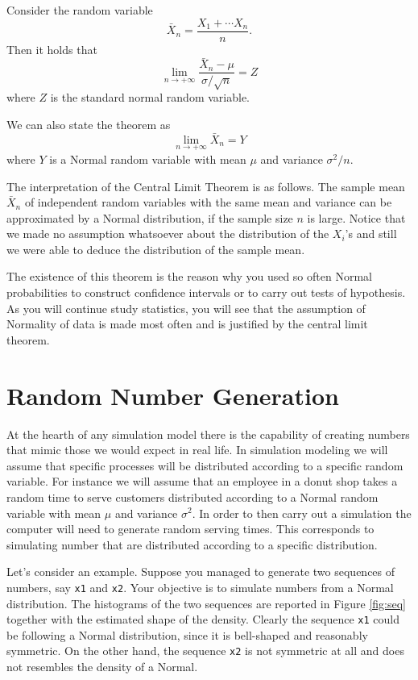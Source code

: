 \documentclass[
]{book}
\theoremstyle{definition}
\theoremstyle{definition}
\theoremstyle{definition}
\theoremstyle{definition}
\theoremstyle{remark}
\begin{document}
Consider the random variable
\[
\bar{X}_n= \frac{X_1+\cdots X_n}{n}.
\]
Then it holds that
\[
\lim_{n\rightarrow + \infty} \frac{\bar{X}_n-\mu}{\sigma/\sqrt{n}} = Z
\]
where \(Z\) is the standard normal random variable.

We can also state the theorem as
\[
\lim_{n\rightarrow + \infty} \bar{X}_n = Y
\]
where \(Y\) is a Normal random variable with mean \(\mu\) and variance \(\sigma^2/n\).

The interpretation of the Central Limit Theorem is as follows. The sample mean \(\bar{X}_n\) of independent random variables with the same mean and variance can be approximated by a Normal distribution, if the sample size \(n\) is large. Notice that we made no assumption whatsoever about the distribution of the \(X_i\)'s and still we were able to deduce the distribution of the sample mean.

The existence of this theorem is the reason why you used so often Normal probabilities to construct confidence intervals or to carry out tests of hypothesis. As you will continue study statistics, you will see that the assumption of Normality of data is made most often and is justified by the central limit theorem.

\hypertarget{random-number-generation}{%
\chapter{Random Number Generation}\label{random-number-generation}}

At the hearth of any simulation model there is the capability of creating numbers that mimic those we would expect in real life. In simulation modeling we will assume that specific processes will be distributed according to a specific random variable. For instance we will assume that an employee in a donut shop takes a random time to serve customers distributed according to a Normal random variable with mean \(\mu\) and variance \(\sigma^2\). In order to then carry out a simulation the computer will need to generate random serving times. This corresponds to simulating number that are distributed according to a specific distribution.

Let's consider an example. Suppose you managed to generate two sequences of numbers, say \texttt{x1} and \texttt{x2}. Your objective is to simulate numbers from a Normal distribution. The histograms of the two sequences are reported in Figure \ref{fig:seq} together with the estimated shape of the density. Clearly the sequence \texttt{x1} could be following a Normal distribution, since it is bell-shaped and reasonably symmetric. On the other hand, the sequence \texttt{x2} is not symmetric at all and does not resembles the density of a Normal.
\end{document}
